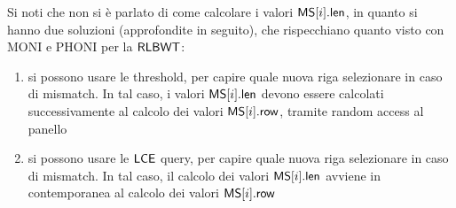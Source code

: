 Si noti che non si è parlato di come calcolare i valori $\mbox{\rm {\sf MS}}[i].\mbox{\rm {\sf len}}$, in
quanto si hanno due soluzioni (approfondite in seguito), che
rispecchiano quanto visto con 
MONI \cite{moni} e PHONI \cite{phoni} per la $\mbox{\rm {\sf RLBWT}}$: 
\begin{enumerate}
  \item si possono usare le threshold, per capire quale nuova riga
  selezionare in 
  caso di mismatch. In tal caso, i valori $\mbox{\rm {\sf MS}}[i].\mbox{\rm {\sf len}}$ devono essere calcolati
  successivamente al calcolo dei valori $\mbox{\rm {\sf MS}}[i].\mbox{\rm {\sf row}}$, tramite random
    access al panello
  \item si possono usare le $\mbox{\rm {\sf LCE}}$ query, per capire quale nuova riga
  selezionare in caso di mismatch. In tal caso, il calcolo dei valori
  $\mbox{\rm {\sf MS}}[i].\mbox{\rm {\sf len}}$ avviene in contemporanea al calcolo dei valori $\mbox{\rm {\sf MS}}[i].\mbox{\rm {\sf row}}$
\end{enumerate}
